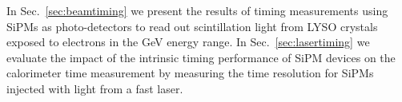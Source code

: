 In Sec.~\ref{sec:beamtiming} we present the results of timing measurements using 
SiPMs as photo-detectors to read out scintillation light from LYSO crystals exposed 
to electrons in the GeV energy range. In Sec.~\ref{sec:lasertiming} we evaluate the
impact of the intrinsic timing performance of SiPM devices on the calorimeter 
time measurement by measuring the time resolution for SiPMs injected with
light from a fast laser.
